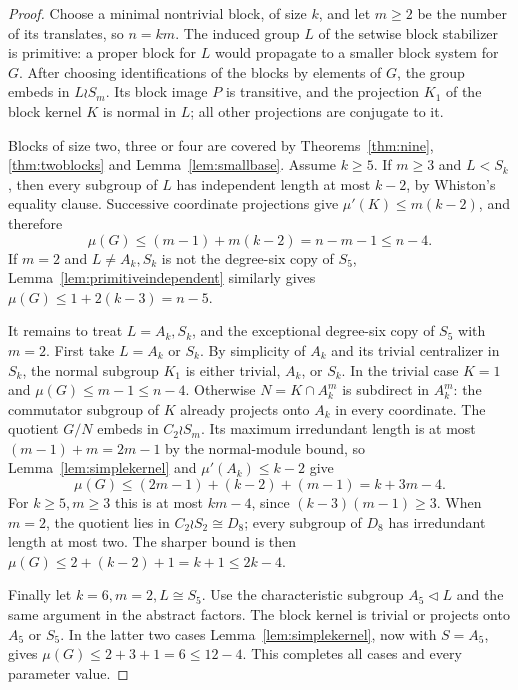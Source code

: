 \begin{proof}
Choose a minimal nontrivial block, of size $k$, and let $m\geq2$
be the number of its translates, so $n=km$. The induced group $L$
of the setwise block stabilizer is primitive: a proper block for $L$
would propagate to a smaller block system for $G$. After choosing
identifications of the blocks by elements of $G$, the group embeds
in $L\wr S_m$. Its block image $P$ is transitive, and the projection
$K_1$ of the block kernel $K$ is normal in $L$; all other projections
are conjugate to it.

Blocks of size two, three or four are covered by
Theorems~\ref{thm:nine}, \ref{thm:twoblocks} and
Lemma~\ref{lem:smallbase}. Assume $k\geq5$.
If $m\geq3$ and $L<S_k$, then every subgroup of $L$ has independent
length at most $k-2$, by Whiston's equality clause. Successive
coordinate projections give $\mu'(K)\leq m(k-2)$, and therefore
\[
 \mu(G)\leq(m-1)+m(k-2)=n-m-1\leq n-4.
\]
If $m=2$ and $L\ne A_k,S_k$ is not the degree-six copy of $S_5$,
Lemma~\ref{lem:primitiveindependent} similarly gives
$\mu(G)\leq1+2(k-3)=n-5$.

It remains to treat $L=A_k,S_k$, and the exceptional degree-six
copy of $S_5$ with $m=2$. First take $L=A_k$ or $S_k$.
By simplicity of $A_k$ and its trivial centralizer in $S_k$, the normal subgroup $K_1$ is either trivial,
$A_k$, or $S_k$. In the trivial case $K=1$ and
$\mu(G)\leq m-1\leq n-4$. Otherwise
$N=K\cap A_k^m$ is subdirect in $A_k^m$: the commutator subgroup
of $K$ already projects onto $A_k$ in every coordinate. The quotient
$G/N$ embeds in $C_2\wr S_m$. Its maximum irredundant length is at
most $(m-1)+m=2m-1$ by the normal-module bound, so
Lemma~\ref{lem:simplekernel} and $\mu'(A_k)\leq k-2$ give
\[
 \mu(G)\leq (2m-1)+(k-2)+(m-1)=k+3m-4.
\]
For $k\geq5,m\geq3$ this is at most $km-4$, since
$(k-3)(m-1)\geq3$.
When $m=2$, the quotient lies in $C_2\wr S_2\cong D_8$;
every subgroup of $D_8$ has irredundant length at most two.
The sharper bound is then $\mu(G)\leq2+(k-2)+1=k+1\leq2k-4$.

Finally let $k=6,m=2,L\cong S_5$. Use the characteristic subgroup
$A_5\lhd L$ and the same argument in the abstract factors.
The block kernel is trivial or projects onto $A_5$ or $S_5$.
In the latter two cases Lemma~\ref{lem:simplekernel}, now with
$S=A_5$, gives $\mu(G)\leq2+3+1=6\leq12-4$.
This completes all cases and every parameter value.
\end{proof}

